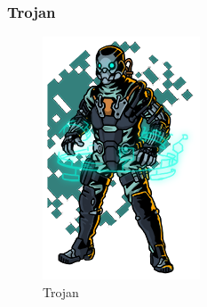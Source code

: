 \documentclass[11pt]{article} %
\begin{document}
\subsubsection{Trojan}

\newpage

\begin{figure}[!htp]
\centering
\includegraphics[scale=0.5]{res/characters/Trojan.png}
\caption{Trojan}
\label{Trojan}
\end{figure}
\end{document}
